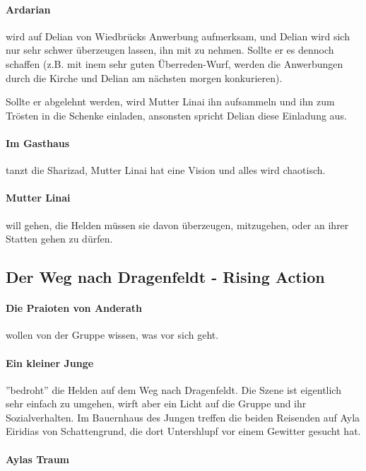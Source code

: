 \paragraph{Ardarian} wird auf Delian von Wiedbrücks Anwerbung aufmerksam, und Delian wird sich nur sehr schwer überzeugen lassen, ihn mit zu nehmen. Sollte er es dennoch schaffen (z.B. mit inem sehr guten Überreden-Wurf, werden die Anwerbungen durch die Kirche und Delian am nächsten morgen konkurieren).

Sollte er abgelehnt werden, wird Mutter Linai ihn aufsammeln und ihn zum Trösten in die Schenke einladen, ansonsten spricht Delian diese Einladung aus.

\paragraph{Im Gasthaus} tanzt die Sharizad, Mutter Linai hat eine Vision und alles wird chaotisch. 

\paragraph{Mutter Linai} will gehen, die Helden müssen sie davon überzeugen, mitzugehen, oder an ihrer Statten gehen zu dürfen. 

\subsection{Der Weg nach Dragenfeldt - Rising Action}

\paragraph{Die Praioten von Anderath} wollen von der Gruppe wissen, was vor sich geht.

\paragraph{Ein kleiner Junge} ''bedroht'' die Helden auf dem Weg nach Dragenfeldt. Die Szene ist eigentlich sehr einfach zu umgehen, wirft aber ein Licht auf die Gruppe und ihr Sozialverhalten. Im Bauernhaus des Jungen treffen die beiden Reisenden auf Ayla Eiridias von Schattengrund, die dort Untershlupf vor einem Gewitter gesucht hat.

\paragraph{Aylas Traum}


